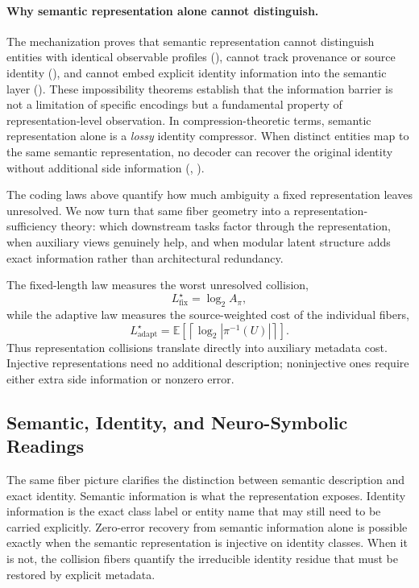 \paragraph{Why semantic representation alone cannot distinguish.}
The mechanization proves that semantic representation cannot distinguish entities with identical observable profiles (), cannot track provenance or source identity (), and cannot embed explicit identity information into the semantic layer (). These impossibility theorems establish that the information barrier is not a limitation of specific encodings but a fundamental property of representation-level observation. In compression-theoretic terms, semantic representation alone is a \emph{lossy} identity compressor. When distinct entities map to the same semantic representation, no decoder can recover the original identity without additional side information (, ).

The coding laws above quantify how much ambiguity a fixed representation leaves unresolved. We now turn that same fiber geometry into a representation-sufficiency theory: which downstream tasks factor through the representation, when auxiliary views genuinely help, and when modular latent structure adds exact information rather than architectural redundancy.

The fixed-length law measures the worst unresolved collision,
\[
L^\star_{\mathrm{fix}} = \log_2 A_\pi,
\]
while the adaptive law measures the source-weighted cost of the individual fibers,
\[
L^\star_{\mathrm{adapt}} = \mathbb E\!\left[\left\lceil \log_2 |\pi^{-1}(U)| \right\rceil\right].
\]
Thus representation collisions translate directly into auxiliary metadata cost. Injective representations need no additional description; noninjective ones require either extra side information or nonzero error.

\subsection{Semantic, Identity, and Neuro-Symbolic Readings}

The same fiber picture clarifies the distinction between semantic description and exact identity. Semantic information is what the representation exposes. Identity information is the exact class label or entity name that may still need to be carried explicitly. Zero-error recovery from semantic information alone is possible exactly when the semantic representation is injective on identity classes. When it is not, the collision fibers quantify the irreducible identity residue that must be restored by explicit metadata.

